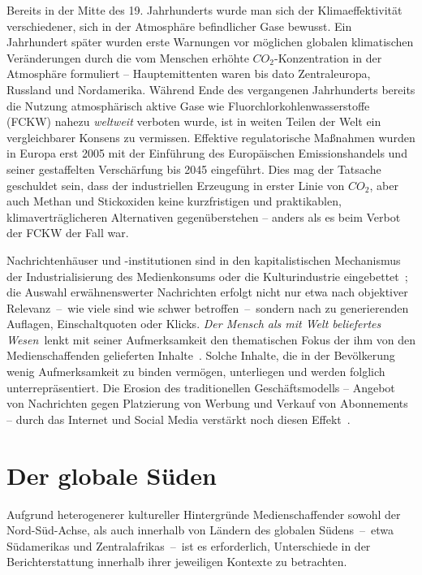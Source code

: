 Bereits in der Mitte des 19. Jahrhunderts wurde man sich der Klimaeffektivität verschiedener, sich in der Atmosphäre befindlicher Gase bewusst.
Ein Jahrhundert später wurden erste Warnungen vor möglichen globalen klimatischen Veränderungen durch die vom Menschen erhöhte \(CO_2\)-Konzentration in der Atmosphäre formuliert -- Hauptemittenten waren bis dato Zentraleuropa, Russland und Nordamerika.
Während Ende des vergangenen Jahrhunderts bereits die Nutzung atmosphärisch aktive Gase wie Fluorchlorkohlenwasserstoffe (FCKW) nahezu \textit{weltweit} verboten wurde, ist in weiten Teilen der Welt ein vergleichbarer Konsens zu vermissen.
Effektive regulatorische Maßnahmen wurden in Europa erst 2005 mit der Einführung des Europäischen Emissionshandels und seiner gestaffelten Verschärfung bis 2045 eingeführt.
Dies mag der Tatsache geschuldet sein, dass der industriellen Erzeugung in erster Linie von \(CO_2\), aber auch Methan und Stickoxiden keine kurzfristigen und praktikablen, klimaverträglicheren Alternativen gegenüberstehen -- anders als es beim Verbot der FCKW der Fall war.\par\medskip
%
Nachrichtenhäuser und -institutionen sind in den kapitalistischen Mechanismus der Industrialisierung des Medienkonsums oder die Kulturindustrie eingebettet~\cite{Book.Horkheimer.Kulturindustrie.2024}; die Auswahl erwähnenswerter Nachrichten erfolgt nicht nur etwa nach objektiver Relevanz~--~wie viele sind wie schwer betroffen~--~sondern nach zu generierenden Auflagen, Einschaltquoten oder Klicks.
\textit{\glqq Der Mensch als mit Welt beliefertes Wesen\grqq}~lenkt mit seiner Aufmerksamkeit den thematischen Fokus der ihm von den Medienschaffenden gelieferten Inhalte~\cite{InCollection.Anders.DieWeltAlsPhantomUndMatrize.2019}.
Solche Inhalte, die in der Bevölkerung wenig Aufmerksamkeit zu binden vermögen, unterliegen und werden folglich unterrepräsentiert.
Die Erosion des traditionellen Geschäftsmodells -- Angebot von Nachrichten gegen Platzierung von Werbung und Verkauf von Abonnements -- durch das Internet und Social Media verstärkt noch diesen Effekt~\cite{Article.Schaefer.ClimateJournalismInAChangingMediaEcosystemAssessingTheProductionOfClimateChangerelatedNewsAroundTheWorld.2020}.

\section{Der globale Süden}

Aufgrund heterogenerer kultureller Hintergründe Medienschaffender sowohl der Nord-Süd-Achse, als auch innerhalb von Ländern des globalen Südens~--~etwa Südamerikas und Zentralafrikas~--~ist es erforderlich, Unterschiede in der Berichterstattung innerhalb ihrer jeweiligen Kontexte zu betrachten.

